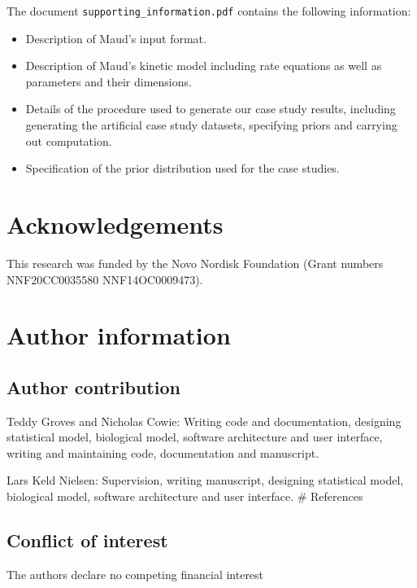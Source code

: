 \documentclass[journal=asbcd6,manuscript=article,layout=traditional]{achemso}
\providecommand{\tightlist}{%
  \setlength{\itemsep}{0pt}\setlength{\parskip}{0pt}}\usepackage{longtable,booktabs,array}
\begin{document}
The document \texttt{supporting\_information.pdf} contains the following
information:

\begin{itemize}
\tightlist
\item
  Description of Maud's input format.
\item
  Description of Maud's kinetic model including rate equations as well
  as parameters and their dimensions.
\item
  Details of the procedure used to generate our case study results,
  including generating the artificial case study datasets, specifying
  priors and carrying out computation.
\item
  Specification of the prior distribution used for the case studies.
\end{itemize}

\hypertarget{acknowledgements}{%
\section{Acknowledgements}\label{acknowledgements}}

This research was funded by the Novo Nordisk Foundation (Grant numbers
NNF20CC0035580 NNF14OC0009473).

\hypertarget{author-information}{%
\section{Author information}\label{author-information}}

\hypertarget{author-contribution}{%
\subsection{Author contribution}\label{author-contribution}}

Teddy Groves and Nicholas Cowie: Writing code and documentation,
designing statistical model, biological model, software architecture and
user interface, writing and maintaining code, documentation and
manuscript.

Lars Keld Nielsen: Supervision, writing manuscript, designing
statistical model, biological model, software architecture and user
interface. \# References

\hypertarget{conflict-of-interest}{%
\subsection{Conflict of interest}\label{conflict-of-interest}}

The authors declare no competing financial interest

\renewcommand{\bibsection}{}

\end{document}
